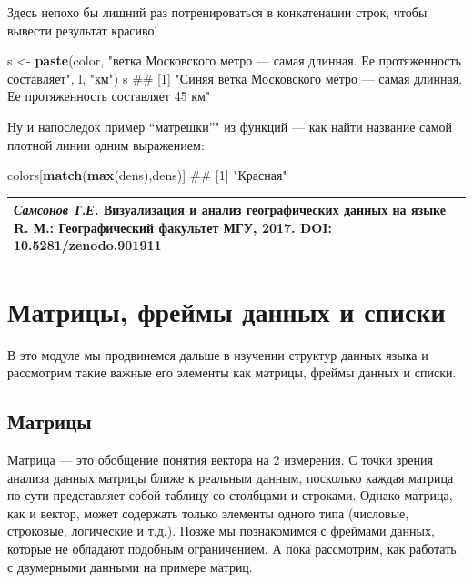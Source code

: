 \documentclass[]{book}
\newenvironment{Shaded}{\begin{snugshade}}{\end{snugshade}}
\newcommand{\KeywordTok}[1]{\textcolor[rgb]{0.13,0.29,0.53}{\textbf{#1}}}
\newcommand{\StringTok}[1]{\textcolor[rgb]{0.31,0.60,0.02}{#1}}
\newcommand{\NormalTok}[1]{#1}
\begin{document}
Здесь непохо бы лишний раз потренироваться в конкатенации строк, чтобы
вывести результат красиво!

\begin{Shaded}
\begin{Highlighting}[]
\NormalTok{s <-}\StringTok{ }\KeywordTok{paste}\NormalTok{(color, }\StringTok{"ветка Московского метро — самая длинная. Ее протяженность составляет"}\NormalTok{, l, }\StringTok{"км"}\NormalTok{)}
\NormalTok{s}
\NormalTok{## [1] "Синяя ветка Московского метро — самая длинная. Ее протяженность составляет 45 км"}
\end{Highlighting}
\end{Shaded}

Ну и напоследок пример ``матрешки''" из функций --- как найти название
самой плотной линии одним выражением:

\begin{Shaded}
\begin{Highlighting}[]
\NormalTok{colors[}\KeywordTok{match}\NormalTok{(}\KeywordTok{max}\NormalTok{(dens),dens)]}
\NormalTok{## [1] "Красная"}
\end{Highlighting}
\end{Shaded}

\begin{longtable}[]{@{}l@{}}
\toprule
\emph{Самсонов Т.Е.} \textbf{Визуализация и анализ географических данных
на языке R.} М.: Географический факультет МГУ, 2017. DOI:
10.5281/zenodo.901911\tabularnewline
\bottomrule
\end{longtable}

\chapter{Матрицы, фреймы данных и списки}\label{matrix_dataframes}

В это модуле мы продвинемся дальше в изучении структур данных языка и
рассмотрим такие важные его элементы как матрицы, фреймы данных и
списки.

\section{Матрицы}\label{matrices}

Матрица --- это обобщение понятия вектора на 2 измерения. С точки зрения
анализа данных матрицы ближе к реальным данным, посколько каждая матрица
по сути представляет собой таблицу со столбцами и строками. Однако
матрица, как и вектор, может содержать только элементы одного типа
(числовые, строковые, логические и т.д.). Позже мы познакомимся с
фреймами данных, которые не обладают подобным ограничением. А пока
рассмотрим, как работать с двумерными данными на примере матриц.
\end{document}
